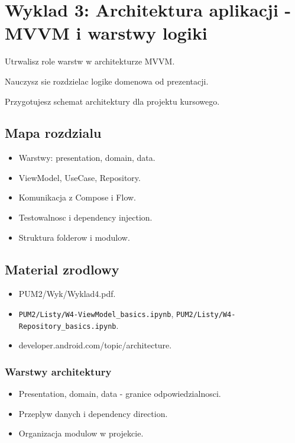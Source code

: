 \chapter{Wyklad 3: Architektura aplikacji - MVVM i warstwy logiki}

\begin{learningobjectives}
  \item Utrwalisz role warstw w architekturze MVVM.
  \item Nauczysz sie rozdzielac logike domenowa od prezentacji.
  \item Przygotujesz schemat architektury dla projektu kursowego.
\end{learningobjectives}

\section{Mapa rozdzialu}
\begin{itemize}
  \item Warstwy: presentation, domain, data.
  \item ViewModel, UseCase, Repository.
  \item Komunikacja z Compose i Flow.
  \item Testowalnosc i dependency injection.
  \item Struktura folderow i modulow.
\end{itemize}

\section{Material zrodlowy}
\begin{itemize}
  \item PUM2/Wyk/Wyklad4.pdf.
  \item \texttt{PUM2/Listy/W4-ViewModel\_basics.ipynb}, \texttt{PUM2/Listy/W4-Repository\_basics.ipynb}.
  \item developer.android.com/topic/architecture.
\end{itemize}

\subsection{Warstwy architektury}
\begin{itemize}
  \item Presentation, domain, data - granice odpowiedzialnosci.
  \item Przeplyw danych i dependency direction.
  \item Organizacja modulow w projekcie.
\end{itemize}

